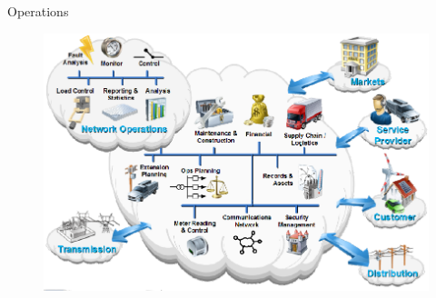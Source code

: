 
\begin{frame}[fragile]{Operations}
	\begin{figure}[h] 
		\includegraphics[scale=0.45]{imgs/ope.png}
	\end{figure}
\end{frame}









